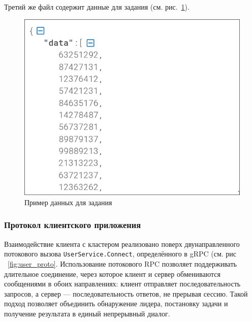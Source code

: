 Третий же файл содержит данные для задания (см. рис.~\ref{fig:user_data}).

\begin{figure}
  \centering
  \includegraphics[scale=0.4]{inc/user-data.png}
  \caption{Пример данных для задания}
  \label{fig:user_data}
\end{figure}

\subsubsection{Протокол клиентского приложения}

Взаимодействие клиента с кластером реализовано поверх двунаправленного
потокового вызова \texttt{UserService.Connect}, определённого в gRPC (см. рис
~\ref{fig:user_proto}. Использование потокового RPC позволяет поддерживать
длительное соединение, через которое клиент и сервер обмениваются сообщениями в
обоих направлениях: клиент отправляет последовательность запросов, а сервер —
последовательность ответов, не прерывая сессию. Такой подход позволяет
объединить обнаружение лидера, постановку задачи и получение результата в
единый непрерывный диалог.

